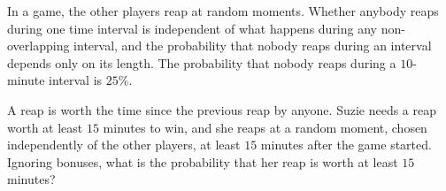 In a game, the other players reap at random moments. Whether anybody reaps during one time interval is independent of what happens during any non-overlapping interval, and the probability that nobody reaps during an interval depends only on its length. The probability that nobody reaps during a $10$-minute interval is $25\%$.

A reap is worth the time since the previous reap by anyone. Suzie needs a reap worth at least $15$ minutes to win, and she reaps at a random moment, chosen independently of the other players, at least $15$ minutes after the game started. Ignoring bonuses, what is the probability that her reap is worth at least $15$ minutes?
